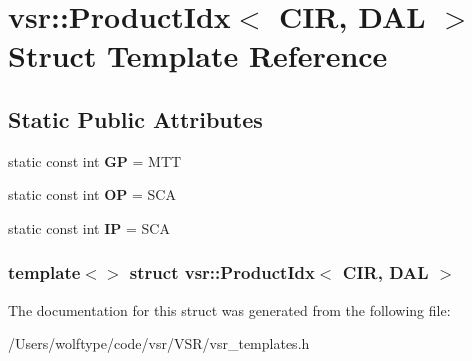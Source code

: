 \hypertarget{structvsr_1_1_product_idx_3_01_c_i_r_00_01_d_a_l_01_4}{\section{vsr\-:\-:Product\-Idx$<$ C\-I\-R, D\-A\-L $>$ Struct Template Reference}
\label{structvsr_1_1_product_idx_3_01_c_i_r_00_01_d_a_l_01_4}
}
\subsection*{Static Public Attributes}
\begin{DoxyCompactItemize}
\item 
\hypertarget{structvsr_1_1_product_idx_3_01_c_i_r_00_01_d_a_l_01_4_afc32d229bafd5a23438f8a467cd88eb0}{static const int {\bfseries G\-P} = M\-T\-T}\label{structvsr_1_1_product_idx_3_01_c_i_r_00_01_d_a_l_01_4_afc32d229bafd5a23438f8a467cd88eb0}

\item 
\hypertarget{structvsr_1_1_product_idx_3_01_c_i_r_00_01_d_a_l_01_4_a7e186ef87ca80e2bd156128f5a8550b1}{static const int {\bfseries O\-P} = S\-C\-A}\label{structvsr_1_1_product_idx_3_01_c_i_r_00_01_d_a_l_01_4_a7e186ef87ca80e2bd156128f5a8550b1}

\item 
\hypertarget{structvsr_1_1_product_idx_3_01_c_i_r_00_01_d_a_l_01_4_a1de66096485c03a6233ee89b874058df}{static const int {\bfseries I\-P} = S\-C\-A}\label{structvsr_1_1_product_idx_3_01_c_i_r_00_01_d_a_l_01_4_a1de66096485c03a6233ee89b874058df}

\end{DoxyCompactItemize}
\subsubsection*{template$<$$>$ struct vsr\-::\-Product\-Idx$<$ C\-I\-R, D\-A\-L $>$}



The documentation for this struct was generated from the following file\-:\begin{DoxyCompactItemize}
\item 
/\-Users/wolftype/code/vsr/\-V\-S\-R/vsr\-\_\-templates.\-h\end{DoxyCompactItemize}
